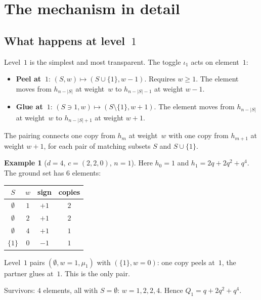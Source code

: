 \documentclass[11pt]{article}
\theoremstyle{plain}
\theoremstyle{definition}
\newtheorem{example}[theorem]{Example}
\begin{document}
\section{The mechanism in detail}
\label{sec:mechanism}


\subsection{What happens at level~$1$}

Level~$1$ is the simplest and most transparent.  The
toggle $\iota_1$ acts on element~$1$:
\begin{itemize}
  \item \textbf{Peel at~$1$}: $(S, w) \mapsto
    (S \cup \{1\}, w - 1)$.  Requires $w \geq 1$.
    The element moves from $h_{n-|S|}$ at weight~$w$ to
    $h_{n-|S|-1}$ at weight $w - 1$.
  \item \textbf{Glue at~$1$}: $(S \ni 1, w) \mapsto
    (S \setminus \{1\}, w + 1)$.  The element moves from
    $h_{n-|S|}$ at weight~$w$ to $h_{n-|S|+1}$ at
    weight $w + 1$.
\end{itemize}

The pairing connects one copy from $h_m$ at weight~$w$
with one copy from $h_{m+1}$ at weight $w + 1$, for each
pair of matching subsets $S$ and $S \cup \{1\}$.

\begin{example}[$d = 4$, $c = (2,2,0)$, $n = 1$]
\label{ex:d4-n1}
Here $h_0 = 1$ and $h_1 = 2q + 2q^2 + q^4$.  The
ground set has $6$ elements:
\begin{center}
\begin{tabular}{c|c|c|c}
$S$ & $w$ & sign & copies \\ \hline
$\emptyset$ & $1$ & $+1$ & $2$ \\
$\emptyset$ & $2$ & $+1$ & $2$ \\
$\emptyset$ & $4$ & $+1$ & $1$ \\
$\{1\}$ & $0$ & $-1$ & $1$
\end{tabular}
\end{center}
Level~$1$ pairs $(\emptyset, w{=}1, \mu_1)$ with
$(\{1\}, w{=}0)$: one copy peels at~$1$, the partner
glues at~$1$.  This is the only pair.

Survivors: $4$ elements, all with $S = \emptyset$:
$w = 1, 2, 2, 4$.
Hence $Q_1 = q + 2q^2 + q^4$.
\end{example}
\end{document}

